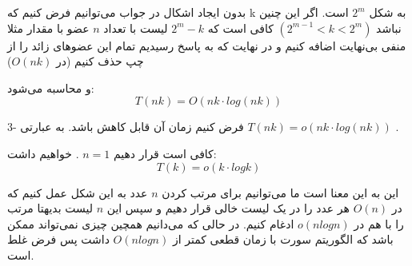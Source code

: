 بدون ایجاد اشکال در جواب می‌توانیم فرض کنیم که k به شکل $2^m$
است. اگر این چنین نباشد 
$(2^{m-1} < k < 2^m)$
کافی است که 
$2^m - k$
لیست با تعداد $n$ 
عضو با مقدار مثلا منفی بی‌نهایت اضافه کنیم و در نهایت که به پاسخ رسیدیم تمام این عضوهای زائد را از چپ حذف کنیم (در $O(nk)$) 

و محاسبه می‌شود:
\begin{equation*}
	T(nk) = O(nk\cdot log(nk))
\end{equation*}

3-
فرض کنیم زمان آن قابل کاهش باشد.
به عبارتی 
$T(nk) = o(nk\cdot log(nk))$
.

کافی است قرار دهیم
$n= 1$
.
خواهیم داشت:
\begin{equation*}
	T(k) = o(k \cdot log k)
\end{equation*}

این به این معنا است ما می‌توانیم برای مرتب کردن 
$n$ 
عدد به این شکل عمل کنیم که در 
$O(n)$
هر عدد را در یک لیست خالی قرار دهیم و سپس این $n$ لیست بدیهتا مرتب را با هم در 
$ o(nlogn)$
ادغام کنیم.
در حالی که می‌دانیم همچین چیزی نمی‌تواند ممکن باشد که الگوریتم سورت با زمان قطعی کمتر از $O(n log n)$ 
داشت 	پس فرض غلط است.